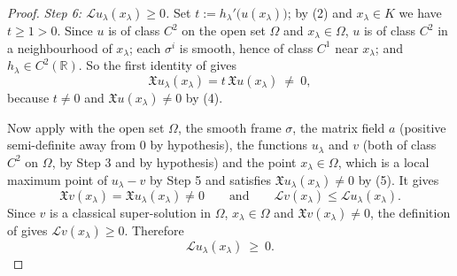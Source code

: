 \begin{proof}
\emph{Step 6: $\mathcal{L}u_\lambda(x_\lambda)\geq0$.} Set $t:=h_\lambda'\big(u(x_\lambda)\big)$;
by (2) and $x_\lambda\in K$ we have $t\geq1>0$. Since $u$ is of class $C^2$ on the open set
$\Omega$ and $x_\lambda\in\Omega$, $u$ is of class $C^2$ in a neighbourhood of $x_\lambda$; each
$\sigma^i$ is smooth, hence of class $C^1$ near $x_\lambda$; and $h_\lambda\in C^2(\mathbb{R})$.
So the first identity of  gives
\begin{equation*}\mathfrak{X}u_\lambda(x_\lambda)=t\,\mathfrak{X}u(x_\lambda)\ \neq\ 0, \tag{5}\end{equation*}
because $t\neq0$ and $\mathfrak{X}u(x_\lambda)\neq0$ by (4).

Now apply  with the open set $\Omega$, the smooth frame $\sigma$, the
matrix field $a$ (positive semi-definite away from $0$ by hypothesis), the functions $u_\lambda$
and $v$ (both of class $C^2$ on $\Omega$, by Step 3 and by hypothesis) and the point
$x_\lambda\in\Omega$, which is a local maximum point of $u_\lambda-v$ by Step 5 and satisfies
$\mathfrak{X}u_\lambda(x_\lambda)\neq0$ by (5). It gives
$$\mathfrak{X}v(x_\lambda)=\mathfrak{X}u_\lambda(x_\lambda)\neq0\qquad\text{and}\qquad
\mathcal{L}v(x_\lambda)\leq\mathcal{L}u_\lambda(x_\lambda).$$
Since $v$ is a classical super-solution in $\Omega$, $x_\lambda\in\Omega$ and
$\mathfrak{X}v(x_\lambda)\neq0$, the definition of  gives
$\mathcal{L}v(x_\lambda)\geq0$. Therefore
\begin{equation*}\mathcal{L}u_\lambda(x_\lambda)\ \geq\ 0. \tag{6}\end{equation*}


\end{proof}
